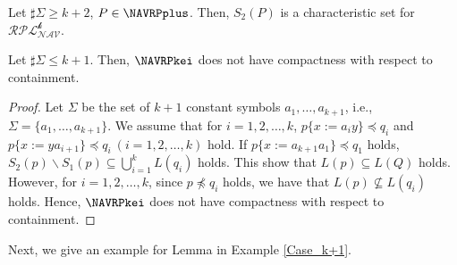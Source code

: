 \begin{col}
Let $\sharp\Sigma \ge k+2$, $P \in \NAVRPplus$.
Then, $S_{2}(P)$ is a characteristic set for $\mathcal{RPL^{\mbox{$k$}}_{NAV}}$.
\end{col}

\begin{lem}\label{Case_k+2}\label{k+2のとき}
Let $\sharp\Sigma \le k+1$.
Then, $\NAVRPkei$ does not have compactness with respect to containment.
\end{lem}
\begin{proof}
Let $\Sigma$ be the set of $k+1$ constant symbols $a_{1}, \ldots , a_{k+1}$, i.e., $\Sigma = \{ a_{1}, \ldots , a_{k+1} \}$.
We assume that for $i=1,2,\ldots,k$, $p \{ x := a_{i}y \} \preceq q_{i}$ and $p \{ x := ya_{i+1} \} \preceq q_{i}~(i=1,2, \ldots ,k)$ hold.
If $p \{ x:= a_{k+1}a_{1} \} \preceq q_{1}$ holds, $S_{2}(p) \backslash S_{1}(p) \subseteq \bigcup^{k}_{i=1} L(q_{i})$ holds.
This show that $L(p) \subseteq L(Q)$ holds.
However, for $i=1,2,\ldots,k$, since $p \not \preceq q_{i}$ holds, we have that $L(p) \not \subseteq L(q_{i})$ holds.
Hence, $\NAVRPkei$ does not have compactness with respect to containment.
\end{proof}

Next, we give an example for Lemma \label{Case_k+2} in Example \ref{Case_k+1}.

